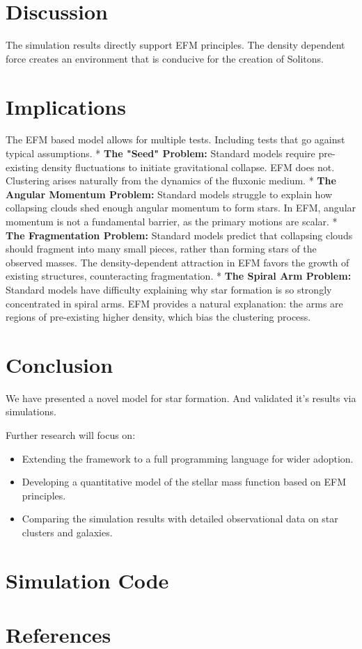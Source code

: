 \documentclass[11pt]{article}
\begin{document}
\section{Discussion}

The simulation results directly support EFM principles. The density dependent force creates an environment that is conducive for the creation of Solitons.

\section{Implications}

The EFM based model allows for multiple tests. Including tests that go against typical assumptions.
*   \textbf{The "Seed" Problem:} Standard models require pre-existing density fluctuations to initiate gravitational collapse. EFM does not. Clustering arises naturally from the dynamics of the fluxonic medium.
*  \textbf{The Angular Momentum Problem:} Standard models struggle to explain how collapsing clouds shed enough angular momentum to form stars. In EFM, angular momentum is not a fundamental barrier, as the primary motions are scalar.
*  \textbf{The Fragmentation Problem:} Standard models predict that collapsing clouds should fragment into many small pieces, rather than forming stars of the observed masses. The density-dependent attraction in EFM favors the growth of existing structures, counteracting fragmentation.
* \textbf{The Spiral Arm Problem:} Standard models have difficulty explaining why star formation is so strongly concentrated in spiral arms. EFM provides a natural explanation: the arms are regions of pre-existing higher density, which bias the clustering process.

\section{Conclusion}

We have presented a novel model for star formation. And validated it's results via simulations.

Further research will focus on:

\begin{itemize}
    \item Extending the framework to a full programming language for wider adoption.
    \item Developing a quantitative model of the stellar mass function based on EFM principles.
    \item Comparing the simulation results with detailed observational data on star clusters and galaxies.
\end{itemize}

\appendix
\section{Simulation Code}



\section{References}

\end{document}
